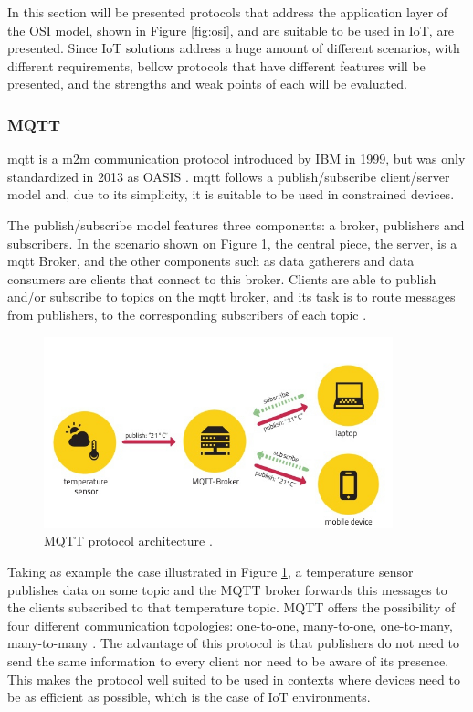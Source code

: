 In this section will be presented protocols that address the application layer of the OSI model, shown in Figure \ref{fig:osi}, and are suitable to be used in IoT, are presented. Since IoT solutions address a huge amount of different scenarios, with different requirements, bellow protocols that have different features will be presented, and the strengths and weak points of each will be evaluated.

\subsubsection{MQTT}

\acf{mqtt} is a \ac{m2m} communication protocol introduced by IBM in 1999, but was only standardized in 2013 as OASIS \cite{Al-fuqaha2015}. \ac{mqtt} follows a publish/subscribe client/server model and, due to its simplicity, it is suitable to be used in constrained devices.

The publish/subscribe model features three components: a broker, publishers and subscribers. In the scenario shown on Figure \ref{fig:mqtt}, the central piece, the server, is a \ac{mqtt} Broker, and the other components such as data gatherers and data consumers are clients that connect to this broker. Clients are able to publish and/or subscribe to topics on the \ac{mqtt} broker, and its task is to route messages from publishers, to the corresponding subscribers of each topic \cite{Al-fuqaha2015}. 

\begin{figure}[H]
	\centering
	\includegraphics[width=0.9\textwidth]{figures/mqtt.jpg}
	\caption{MQTT protocol architecture \cite{Turan}.}
	\label{fig:mqtt}
\end{figure}

Taking as example the case illustrated in Figure \ref{fig:mqtt}, a temperature sensor publishes data on some topic and the MQTT broker forwards this messages to the clients subscribed to that temperature topic. MQTT offers the possibility of four different communication topologies: one-to-one, many-to-one, one-to-many, many-to-many \cite{Chen2016}. The advantage of this protocol is that publishers do not need to send the same information to every client nor need to be aware of its presence. This makes the protocol well suited to be used in contexts where devices need to be as efficient as possible, which is the case of IoT environments.

